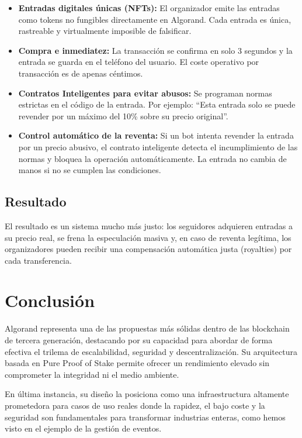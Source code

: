 \documentclass[12pt]{article}
\begin{document}
\begin{itemize}
    \item \textbf{Entradas digitales únicas (NFTs):} El organizador emite las entradas como tokens no fungibles directamente en Algorand. Cada entrada es única, rastreable y virtualmente imposible de falsificar.
    \item \textbf{Compra e inmediatez:} La transacción se confirma en solo 3 segundos y la entrada se guarda en el teléfono del usuario. El coste operativo por transacción es de apenas céntimos.
    \item \textbf{Contratos Inteligentes para evitar abusos:} Se programan normas estrictas en el código de la entrada. Por ejemplo: ``Esta entrada solo se puede revender por un máximo del 10\% sobre su precio original''.
    \item \textbf{Control automático de la reventa:} Si un bot intenta revender la entrada por un precio abusivo, el contrato inteligente detecta el incumplimiento de las normas y bloquea la operación automáticamente. La entrada no cambia de manos si no se cumplen las condiciones.
\end{itemize}

\subsection{Resultado}

El resultado es un sistema mucho más justo: los seguidores adquieren entradas a su precio real, se frena la especulación masiva y, en caso de reventa legítima, los organizadores pueden recibir una compensación automática justa (royalties) por cada transferencia.

\section*{Conclusión}

Algorand representa una de las propuestas más sólidas dentro de las blockchain de tercera generación, destacando por su capacidad para abordar de forma efectiva el trilema de escalabilidad, seguridad y descentralización. Su arquitectura basada en Pure Proof of Stake permite ofrecer un rendimiento elevado sin comprometer la integridad ni el medio ambiente.

En última instancia, su diseño la posiciona como una infraestructura altamente prometedora para casos de uso reales donde la rapidez, el bajo coste y la seguridad son fundamentales para transformar industrias enteras, como hemos visto en el ejemplo de la gestión de eventos.
\end{document}
